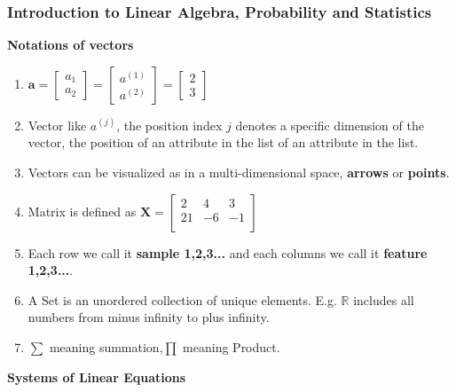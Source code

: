 \documentclass{article}
\newcommand{\matr}[1]{\mathbf{#1}}
\begin{document}
\subsubsection{Introduction to Linear Algebra, Probability and Statistics}
\textbf{Notations of vectors}
\begin{enumerate}
    \item $\matr{a} = \begin{bmatrix}
        a_1 \\ a_2
    \end{bmatrix}
    = \begin{bmatrix}
        a^{(1)} \\
        a^{(2)}
    \end{bmatrix}
    = \begin{bmatrix}
        2 \\3
    \end{bmatrix}$
    \item  Vector like $a^{(j)}$, the position index $j$ denotes a specific dimension of the vector, the position of an attribute in the list of an attribute in the list.
    \item Vectors can be visualized as in a multi-dimensional space, \textbf{arrows} or \textbf{points}. 
    \item Matrix is defined as $\displaystyle \matr{X} = \begin{bmatrix}
        2 & 4 & 3\\
        21 & -6 & -1 \\
    \end{bmatrix}$
    \item Each row we call it \textbf{sample 1,2,3...} and each columns we call it \textbf{feature 1,2,3...}. 
    \item A Set is an unordered collection of unique elements. E.g. $\mathbb{R}$ includes all numbers from minus infinity to plus infinity.
    \item $\displaystyle \sum$ meaning summation,$\displaystyle \prod$ meaning Product.
\end{enumerate}
\textbf{Systems of Linear Equations}
\end{document}
